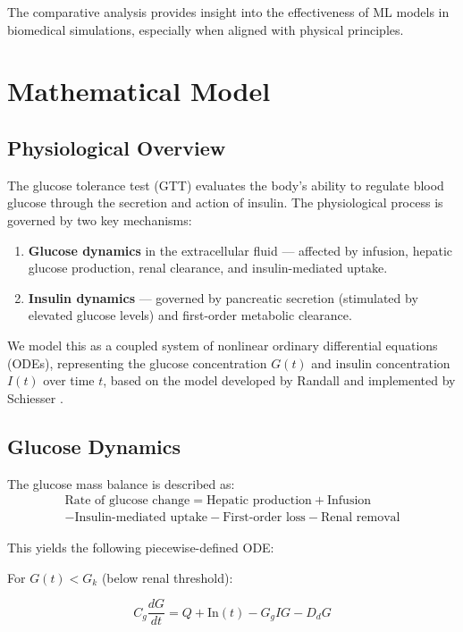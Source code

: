 \documentclass[conference]{IEEEtran}
\begin{document}
The comparative analysis provides insight into the effectiveness of ML models in biomedical simulations, especially when aligned with physical principles.

\section{Mathematical Model}

\subsection{Physiological Overview}

The glucose tolerance test (GTT) evaluates the body’s ability to regulate blood glucose through the secretion and action of insulin. The physiological process is governed by two key mechanisms:

\begin{enumerate}
    \item \textbf{Glucose dynamics} in the extracellular fluid — affected by infusion, hepatic glucose production, renal clearance, and insulin-mediated uptake.
    \item \textbf{Insulin dynamics} — governed by pancreatic secretion (stimulated by elevated glucose levels) and first-order metabolic clearance.
\end{enumerate}

We model this as a coupled system of nonlinear ordinary differential equations (ODEs), representing the glucose concentration $G(t)$ and insulin concentration $I(t)$ over time $t$, based on the model developed by Randall and implemented by Schiesser \cite{schiesser}.

\subsection{Glucose Dynamics}

The glucose mass balance is described as:
\begin{multline}
    \text{Rate of glucose change} = \text{Hepatic production} + \text{Infusion} \\
    - \text{Insulin-mediated uptake} - \text{First-order loss} - \text{Renal removal}
\end{multline}

This yields the following piecewise-defined ODE:

For $G(t) < G_k$ (below renal threshold):

\begin{equation}
    C_g \frac{dG}{dt} = Q + \mathrm{In}(t) - G_g I G - D_d G
    \label{eq:glucose_below_threshold}
\end{equation}
\end{document}
